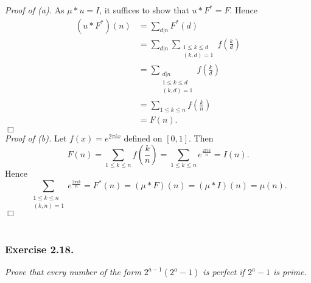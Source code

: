 \documentclass{article}
\begin{document}
\emph{Proof of (a).}
  As $\mu * u = I$, it suffices to show that $u * F^{*} = F$.
  Hence
  \begin{align*}
    (u * F^{*})(n)
    &= \sum_{d|n} F^{*}(d) \\
    &= \sum_{d|n} \sum_{\substack{1 \leq k \leq d \\ (k,d)=1}} f\left( \frac{k}{d} \right) \\
    &= \sum_{\substack{d|n \\ 1 \leq k \leq d \\ (k,d)=1}} f\left( \frac{k}{d} \right) \\
    &= \sum_{1 \leq k \leq n} f\left( \frac{k}{n} \right) \\
    &= F(n).
  \end{align*}
$\Box$ \\



\emph{Proof of (b).}
  Let $f(x) = e^{2\pi i x}$ defined on $[0,1]$.
  Then
  \[
    F(n)
    = \sum_{1 \leq k \leq n} f\left( \frac{k}{n} \right)
    = \sum_{1 \leq k \leq n} e^{\frac{2\pi i k}{n}}
    = I(n).
  \]
  Hence
  \[
    \sum_{\substack{1 \leq k \leq n \\ (k,n)=1}} e^{\frac{2\pi i k}{n}}
    = F^{*}(n)
    = (\mu * F)(n)
    = (\mu * I)(n)
    = \mu(n).
  \]
$\Box$ \\\\















\subsubsection*{Exercise 2.18.}
\emph{Prove that every number of the form $2^{a-1}(2^a-1)$ is perfect
if $2^a-1$ is prime.} \\
\end{document}
